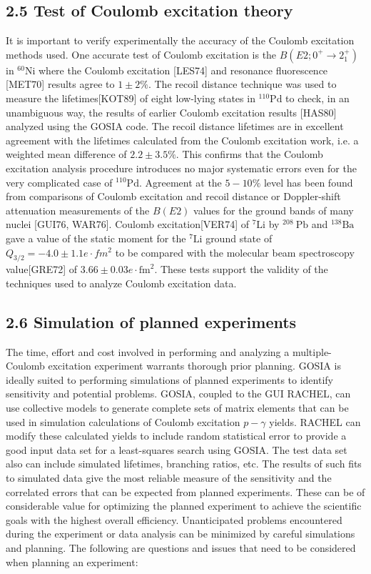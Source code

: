 \documentclass[10pt]{article}
\begin{document}
\subsection*{2.5 Test of Coulomb excitation theory}
It is important to verify experimentally the accuracy of the Coulomb excitation methods used. One accurate test of Coulomb excitation is the $B\left(E 2 ; 0^{+} \rightarrow 2_{1}^{+}\right)$in ${ }^{60} \mathrm{Ni}$ where the Coulomb excitation [LES74] and resonance fluorescence [MET70] results agree to $1 \pm 2 \%$. The recoil distance technique was used to measure the lifetimes[KOT89] of eight low-lying states in ${ }^{110} \mathrm{Pd}$ to check, in an unambiguous way, the results of earlier Coulomb excitation results [HAS80] analyzed using the GOSIA code. The recoil distance lifetimes are in excellent agreement with the lifetimes calculated from the Coulomb excitation work, i.e. a weighted mean difference of $2.2 \pm 3.5 \%$. This confirms that the Coulomb excitation analysis procedure introduces no major systematic errors even for the very complicated case of ${ }^{110} \mathrm{Pd}$. Agreement at the $5-10 \%$ level has been found from comparisons of Coulomb excitation and recoil distance or Doppler-shift attenuation measurements of the $B(E 2)$ values for the ground bands of many nuclei [GUI76, WAR76]. Coulomb excitation[VER74] of ${ }^{7} \mathrm{Li}$ by ${ }^{208} \mathrm{~Pb}$ and ${ }^{138} \mathrm{Ba}$ gave a value of the static moment for the ${ }^{7} \mathrm{Li}$ ground state of $Q_{3 / 2}=-4.0 \pm 1.1 e \cdot f m^{2}$ to be compared with the molecular beam spectroscopy value[GRE72] of $3.66 \pm 0.03 e \cdot \mathrm{fm}^{2}$. These tests support the validity of the techniques used to analyze Coulomb excitation data.

\subsection*{2.6 Simulation of planned experiments}
The time, effort and cost involved in performing and analyzing a multiple-Coulomb excitation experiment warrants thorough prior planning. GOSIA is ideally suited to performing simulations of planned experiments to identify sensitivity and potential problems. GOSIA, coupled to the GUI RACHEL, can use collective models to generate complete sets of matrix elements that can be used in simulation calculations of Coulomb excitation $p-\gamma$ yields. RACHEL can modify these calculated yields to include random statistical error to provide a good input data set for a least-squares search using GOSIA. The test data set also can include simulated lifetimes, branching ratios, etc. The results of such fits to simulated data give the most reliable measure of the sensitivity and the correlated errors that can be expected from planned experiments. These can be of considerable value for optimizing the planned experiment to achieve the scientific goals with the highest overall efficiency. Unanticipated problems encountered during the experiment or data analysis can be minimized by careful simulations and planning. The following are questions and issues that need to be considered when planning an experiment:
\end{document}
